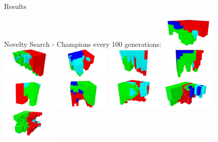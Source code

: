 \documentclass{beamer}
\begin{document}
\begin{frame}[allowframebreaks]{Results}
\begin{minipage}{\textwidth}
\begin{block}{Novelty Search - Champions every 100 generations:}
\includegraphics[width=0.2\textwidth]{figures/Robots/n_4_g_100.jpg}
\includegraphics[width=0.2\textwidth]{figures/Robots/n_4_g_200.jpg}
\includegraphics[width=0.2\textwidth]{figures/Robots/n_4_g_300.jpg}
\includegraphics[width=0.2\textwidth]{figures/Robots/n_4_g_400.jpg}
\includegraphics[width=0.2\textwidth]{figures/Robots/n_4_g_500.jpg}\\
\includegraphics[width=0.2\textwidth]{figures/Robots/n_4_g_600.jpg}
\includegraphics[width=0.2\textwidth]{figures/Robots/n_4_g_700.jpg}
\includegraphics[width=0.2\textwidth]{figures/Robots/n_4_g_800.jpg}
\includegraphics[width=0.2\textwidth]{figures/Robots/n_4_g_900.jpg}
\includegraphics[width=0.2\textwidth]{figures/Robots/n_4_g_1000.jpg}
\end{block}


\end{minipage}
\end{frame}
\end{document}
